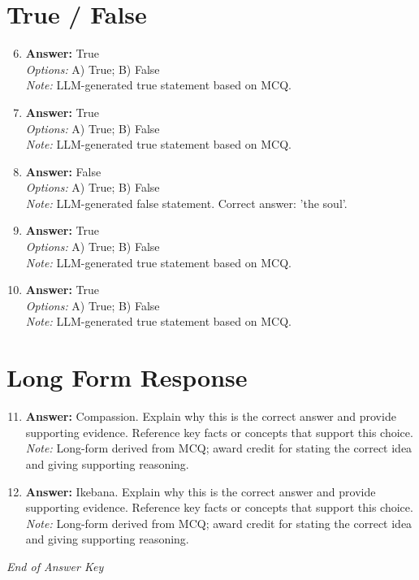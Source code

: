 \documentclass[12pt]{article}
\begin{document}
\section*{True / False}
\begin{enumerate}[label=\arabic*.]
\setcounter{enumi}{5}
\item \textbf{Answer:} True
\\ \textit{Options:} A) True; B) False
\\ \textit{Note:} LLM-generated true statement based on MCQ.
\item \textbf{Answer:} True
\\ \textit{Options:} A) True; B) False
\\ \textit{Note:} LLM-generated true statement based on MCQ.
\item \textbf{Answer:} False
\\ \textit{Options:} A) True; B) False
\\ \textit{Note:} LLM-generated false statement. Correct answer: 'the soul'.
\item \textbf{Answer:} True
\\ \textit{Options:} A) True; B) False
\\ \textit{Note:} LLM-generated true statement based on MCQ.
\item \textbf{Answer:} True
\\ \textit{Options:} A) True; B) False
\\ \textit{Note:} LLM-generated true statement based on MCQ.
\end{enumerate}

\section*{Long Form Response}
\begin{enumerate}[label=\arabic*.]
\setcounter{enumi}{10}
\item \textbf{Answer:} Compassion. Explain why this is the correct answer and provide supporting evidence. Reference key facts or concepts that support this choice.
\\ \textit{Note:} Long-form derived from MCQ; award credit for stating the correct idea and giving supporting reasoning.
\item \textbf{Answer:} Ikebana. Explain why this is the correct answer and provide supporting evidence. Reference key facts or concepts that support this choice.
\\ \textit{Note:} Long-form derived from MCQ; award credit for stating the correct idea and giving supporting reasoning.
\end{enumerate}

\vfill
\noindent\textit{End of Answer Key}
\end{document}
